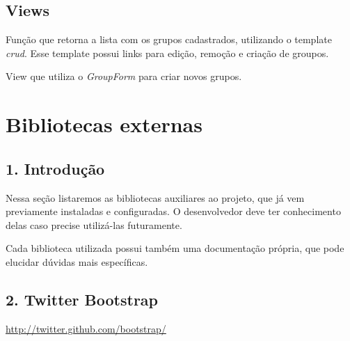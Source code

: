 \documentclass[letterpaper,10pt,brazil]{sphinxmanual}
\begin{document}
\subsection{Views}
\label{apps/groups:module-groups.views}\label{apps/groups:views}

\begin{fulllineitems}
\label{apps/groups:groups.views.index}
Função que retorna a lista com os grupos cadastrados, utilizando o template \emph{crud}. Esse template possui links para edição, remoção e criação de groupos.

\end{fulllineitems}


\begin{fulllineitems}
\label{apps/groups:groups.views.create}
View que utiliza o \emph{GroupForm} para criar novos grupos.

\end{fulllineitems}



\section{Bibliotecas externas}
\label{bibliotecas:bibliotecas-externas}\label{bibliotecas::doc}

\subsection{1. Introdução}
\label{bibliotecas:introducao}
Nessa seção listaremos as bibliotecas auxiliares ao projeto, que já vem previamente instaladas e configuradas. O desenvolvedor deve ter conhecimento delas caso precise utilizá-las futuramente.

Cada biblioteca utilizada possui também uma documentação própria, que pode elucidar dúvidas mais específicas.


\subsection{2. Twitter Bootstrap}
\label{bibliotecas:twitter-bootstrap}
\href{http://twitter.github.com/bootstrap/}{http://twitter.github.com/bootstrap/}
\end{document}
